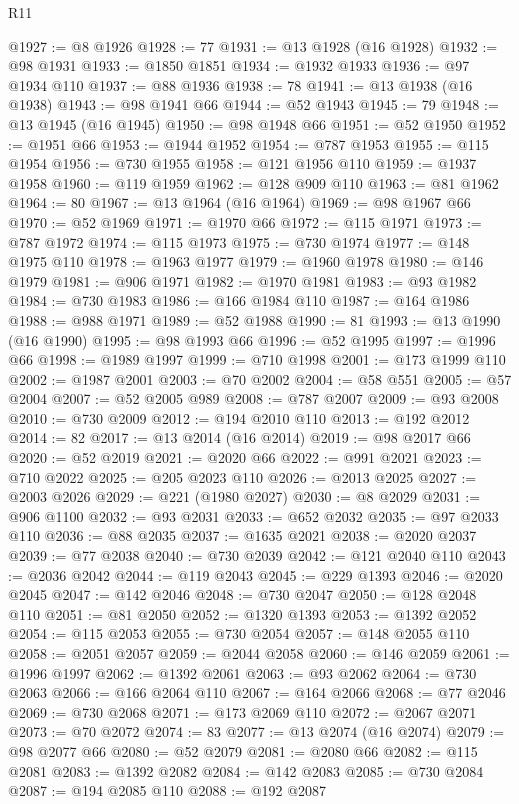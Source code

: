 \begin{lexlean}{R11}
\begin{coremodule}
@1927 := @8 @1926
@1928 := 77
@1931 := @13 @1928 (@16 @1928)
@1932 := @98 @1931
@1933 := @1850 @1851
@1934 := @1932 @1933
@1936 := @97 @1934 @110
@1937 := @88 @1936
@1938 := 78
@1941 := @13 @1938 (@16 @1938)
@1943 := @98 @1941 @66
@1944 := @52 @1943
@1945 := 79
@1948 := @13 @1945 (@16 @1945)
@1950 := @98 @1948 @66
@1951 := @52 @1950
@1952 := @1951 @66
@1953 := @1944 @1952
@1954 := @787 @1953
@1955 := @115 @1954
@1956 := @730 @1955
@1958 := @121 @1956 @110
@1959 := @1937 @1958
@1960 := @119 @1959
@1962 := @128 @909 @110
@1963 := @81 @1962
@1964 := 80
@1967 := @13 @1964 (@16 @1964)
@1969 := @98 @1967 @66
@1970 := @52 @1969
@1971 := @1970 @66
@1972 := @115 @1971
@1973 := @787 @1972
@1974 := @115 @1973
@1975 := @730 @1974
@1977 := @148 @1975 @110
@1978 := @1963 @1977
@1979 := @1960 @1978
@1980 := @146 @1979
@1981 := @906 @1971
@1982 := @1970 @1981
@1983 := @93 @1982
@1984 := @730 @1983
@1986 := @166 @1984 @110
@1987 := @164 @1986
@1988 := @988 @1971
@1989 := @52 @1988
@1990 := 81
@1993 := @13 @1990 (@16 @1990)
@1995 := @98 @1993 @66
@1996 := @52 @1995
@1997 := @1996 @66
@1998 := @1989 @1997
@1999 := @710 @1998
@2001 := @173 @1999 @110
@2002 := @1987 @2001
@2003 := @70 @2002
@2004 := @58 @551
@2005 := @57 @2004
@2007 := @52 @2005 @989
@2008 := @787 @2007
@2009 := @93 @2008
@2010 := @730 @2009
@2012 := @194 @2010 @110
@2013 := @192 @2012
@2014 := 82
@2017 := @13 @2014 (@16 @2014)
@2019 := @98 @2017 @66
@2020 := @52 @2019
@2021 := @2020 @66
@2022 := @991 @2021
@2023 := @710 @2022
@2025 := @205 @2023 @110
@2026 := @2013 @2025
@2027 := @2003 @2026
@2029 := @221 (@1980 @2027)
@2030 := @8 @2029
@2031 := @906 @1100
@2032 := @93 @2031
@2033 := @652 @2032
@2035 := @97 @2033 @110
@2036 := @88 @2035
@2037 := @1635 @2021
@2038 := @2020 @2037
@2039 := @77 @2038
@2040 := @730 @2039
@2042 := @121 @2040 @110
@2043 := @2036 @2042
@2044 := @119 @2043
@2045 := @229 @1393
@2046 := @2020 @2045
@2047 := @142 @2046
@2048 := @730 @2047
@2050 := @128 @2048 @110
@2051 := @81 @2050
@2052 := @1320 @1393
@2053 := @1392 @2052
@2054 := @115 @2053
@2055 := @730 @2054
@2057 := @148 @2055 @110
@2058 := @2051 @2057
@2059 := @2044 @2058
@2060 := @146 @2059
@2061 := @1996 @1997
@2062 := @1392 @2061
@2063 := @93 @2062
@2064 := @730 @2063
@2066 := @166 @2064 @110
@2067 := @164 @2066
@2068 := @77 @2046
@2069 := @730 @2068
@2071 := @173 @2069 @110
@2072 := @2067 @2071
@2073 := @70 @2072
@2074 := 83
@2077 := @13 @2074 (@16 @2074)
@2079 := @98 @2077 @66
@2080 := @52 @2079
@2081 := @2080 @66
@2082 := @115 @2081
@2083 := @1392 @2082
@2084 := @142 @2083
@2085 := @730 @2084
@2087 := @194 @2085 @110
@2088 := @192 @2087

\end{coremodule}
\end{lexlean}
